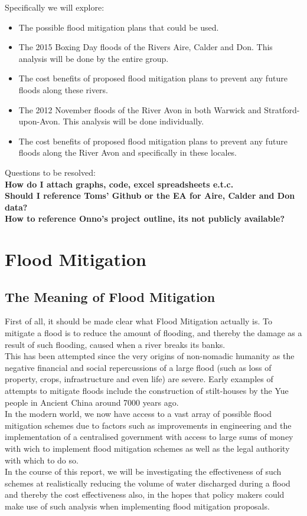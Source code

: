 \documentclass[11 pt, a4paper]{article}
\begin{document}
Specifically we will explore:\\
\begin{framed}
\begin{itemize}
\item The possible flood mitigation plans that could be used.
\item The 2015 Boxing Day floods of the Rivers Aire, Calder and Don. This analysis will be done by the entire group.
\item The cost benefits of proposed flood mitigation plans to prevent any future floods along these rivers.
\item The 2012 November floods of the River Avon in both Warwick and Stratford-upon-Avon. This analysis will be done individually.
\item The cost benefits of proposed flood mitigation plans to prevent any future floods along the River Avon and specifically in these locales.
\end{itemize}
\end{framed}
Questions to be resolved:\\
\textbf{How do I attach graphs, code, excel spreadsheets e.t.c.}\\
\textbf{Should I reference Toms' Github or the EA for Aire, Calder and Don data?}\\
\textbf{How to reference Onno's project outline, its not publicly available?}\\


\newpage
\section{Flood Mitigation}
\subsection{The Meaning of Flood Mitigation}
First of all, it should be made clear what Flood Mitigation actually is. To mitigate a flood is to reduce the amount of flooding, and thereby the damage as a result of such flooding, caused when a river breaks its banks.\\ 
This has been attempted since the very origins of non-nomadic humanity as the negative financial and social repercussions of a large flood (such as loss of property, crops, infrastructure and even life) are severe. Early examples of attempts to mitigate floods include the construction of stilt-houses by the Yue people in Ancient China around 7000 years ago.\cite{3}\\ 
In the modern world, we now have access to a vast array of possible flood mitigation schemes due to factors such as improvements in engineering and the implementation of a centralised  government with access to large sums of money with wich to implement flood mitigation schemes as well as the legal authority with which to do so.\\
In the course of this report, we will be investigating the effectiveness of such schemes at realistically reducing the volume of water discharged during a flood and thereby the cost effectiveness also, in the hopes that policy makers could make use of such analysis when implementing flood mitigation proposals.
\end{document}
